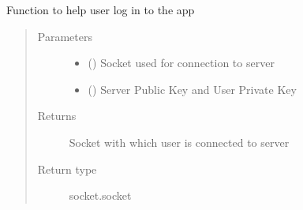 \documentclass[letterpaper,10pt,english]{sphinxmanual}
\begin{document}

\begin{fulllineitems}
\label{\detokenize{app:app.login}}
Function to help user log in to the app
\begin{quote}\begin{description}
\item[{Parameters}] \leavevmode\begin{itemize}
\item {} 
 () \textendash{} Socket used for connection to server

\item {} 
 () \textendash{} Server Public Key and User Private Key

\end{itemize}

\item[{Returns}] \leavevmode
Socket with which user is connected to server

\item[{Return type}] \leavevmode
socket.socket

\end{description}\end{quote}

\end{fulllineitems}

\end{document}

